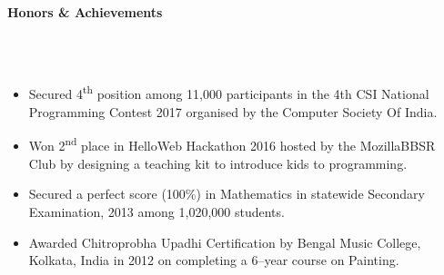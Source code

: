 \documentclass[a4paper,10pt]{article}
\newcommand{\lsep}{-0.5cm}
\newcommand{\resheading}[1]{{\large \colorbox{mygrey}{\begin{minipage}{0.99\textwidth}{\textbf{#1 \vphantom{p\^{E}}}}\end{minipage}}}}
\begin{document}
\resheading{\textbf{Honors \& Achievements}}\\[\lsep]\\[-0.2cm]

\begin{itemize}
\item {Secured 4\textsuperscript{th} position among 11,000 participants in the 4th CSI National Programming Contest 2017 organised by the Computer Society Of India.}\\[-0.5cm]
\item {Won 2\textsuperscript{nd} place in HelloWeb Hackathon 2016 hosted by the MozillaBBSR Club by designing a teaching kit to introduce kids to programming.}\\[-0.5cm]
\item {Secured a perfect score (100\%) in Mathematics in statewide Secondary Examination, 2013 among 1,020,000 students.}\\[-0.5cm]
\item {Awarded Chitroprobha Upadhi Certification by Bengal Music College, Kolkata, India in 2012 on completing a 6--year course on Painting.}\\[-0.5cm]
\end{itemize}
\end{document}
